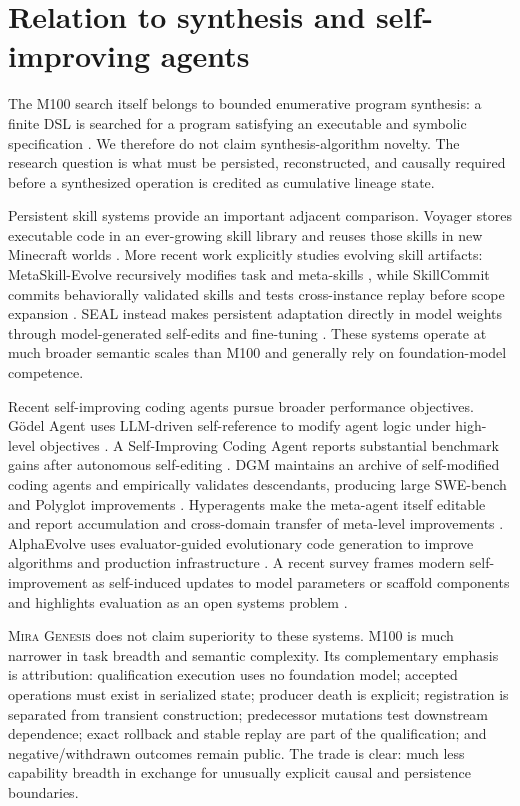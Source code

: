 \documentclass[10pt]{article}
\newcommand{\genesis}{\textsc{Mira Genesis}\xspace}
\begin{document}
\section{Relation to synthesis and self-improving agents}
The M100 search itself belongs to bounded enumerative program synthesis: a finite DSL is searched for a program satisfying an executable and symbolic specification \cite{gulwani2017synthesis}. We therefore do not claim synthesis-algorithm novelty. The research question is what must be persisted, reconstructed, and causally required before a synthesized operation is credited as cumulative lineage state.

Persistent skill systems provide an important adjacent comparison. Voyager stores executable code in an ever-growing skill library and reuses those skills in new Minecraft worlds \cite{wang2023voyager}. More recent work explicitly studies evolving skill artifacts: MetaSkill-Evolve recursively modifies task and meta-skills \cite{wang2026metaskill}, while SkillCommit commits behaviorally validated skills and tests cross-instance replay before scope expansion \cite{he2026skillcommit}. SEAL instead makes persistent adaptation directly in model weights through model-generated self-edits and fine-tuning \cite{zweiger2025seal}. These systems operate at much broader semantic scales than M100 and generally rely on foundation-model competence.

Recent self-improving coding agents pursue broader performance objectives. G{\"o}del Agent uses LLM-driven self-reference to modify agent logic under high-level objectives \cite{yin2024godelagent}. A Self-Improving Coding Agent reports substantial benchmark gains after autonomous self-editing \cite{robeyns2025selfimproving}. DGM maintains an archive of self-modified coding agents and empirically validates descendants, producing large SWE-bench and Polyglot improvements \cite{zhang2025dgm}. Hyperagents make the meta-agent itself editable and report accumulation and cross-domain transfer of meta-level improvements \cite{zhang2026hyperagents}. AlphaEvolve uses evaluator-guided evolutionary code generation to improve algorithms and production infrastructure \cite{novikov2025alphaevolve}. A recent survey frames modern self-improvement as self-induced updates to model parameters or scaffold components and highlights evaluation as an open systems problem \cite{ren2026survey}.

\genesis does not claim superiority to these systems. M100 is much narrower in task breadth and semantic complexity. Its complementary emphasis is attribution: qualification execution uses no foundation model; accepted operations must exist in serialized state; producer death is explicit; registration is separated from transient construction; predecessor mutations test downstream dependence; exact rollback and stable replay are part of the qualification; and negative/withdrawn outcomes remain public. The trade is clear: much less capability breadth in exchange for unusually explicit causal and persistence boundaries.
\end{document}
